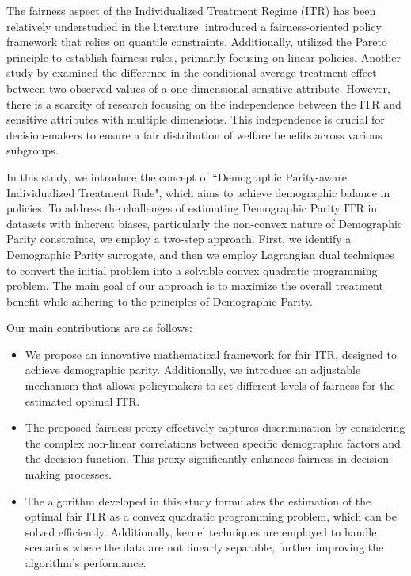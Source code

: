\documentclass[12pt]{article}
\theoremstyle{plain}
\theoremstyle{definition}
\theoremstyle{remark}
\begin{document}
The fairness aspect of the Individualized Treatment Regime (ITR) has been relatively understudied in the literature. \cite{fang2022fairness} introduced a fairness-oriented policy framework that relies on quantile constraints. Additionally, \cite{viviano2023fair} utilized the Pareto principle to establish fairness rules, primarily focusing on linear policies. Another study by \cite{kim2023fair} examined the difference in the conditional average treatment effect between two observed values of a one-dimensional sensitive attribute. However, there is a scarcity of research focusing on the independence between the ITR and sensitive attributes with multiple dimensions. This independence is crucial for decision-makers to ensure a fair distribution of welfare benefits across various subgroups.



In this study, we introduce the concept of ``Demographic Parity-aware Individualized Treatment Rule", which aims to achieve demographic balance in policies.
To address the challenges of estimating Demographic Parity ITR in datasets with inherent biases, particularly the non-convex nature of Demographic Parity constraints, we employ a two-step approach. First, we identify a Demographic Parity surrogate, and then we employ Lagrangian dual techniques to convert the initial problem into a solvable convex quadratic programming problem. The main goal of our approach is to maximize the overall treatment benefit while adhering to the principles of Demographic Parity.

Our main contributions are as follows:
\begin{itemize}

\item[(i)]    We propose an innovative mathematical framework for fair ITR, designed to achieve demographic parity. Additionally, we introduce an adjustable  mechanism that allows policymakers to set different levels of fairness for the estimated optimal ITR.

\item[(ii)] The proposed fairness proxy effectively captures discrimination by considering the complex  non-linear correlations between specific demographic factors and the decision function. This  proxy significantly  enhances fairness in decision-making processes.

\item[(iii)] The algorithm developed in this study formulates the estimation of the optimal fair ITR as a convex quadratic programming problem, which can be solved efficiently. Additionally, kernel techniques are employed to  handle scenarios where the data are not linearly separable, further improving the algorithm's performance.
\end{itemize}
\end{document}
